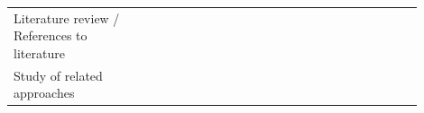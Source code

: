 \documentclass[english, 12pt, a4paper, sci, utf8, a-1b, online]{aaltothesis}
\begin{document}
{\begin{center}
\begin{longtable}{p{0.3\linewidth}p{0.6\linewidth}}
      Literature review / References to literature & \textcite{fagerholm-dx-concept-and-definition} \newline \textcite{henriques2018improving} \newline \textcite{fontao2017investigating} \newline \textcite{chatley2019supporting} \newline \textcite{pinter2019polymorph} \newline \textcite{entering-an-ecosystem} \newline \textcite{fagerholm2014examining} \newline \textcite{fontao2016mseco} \newline \textcite{fontao2015research} \newline \textcite{myers2016improving} \newline \textcite{ekwoge2017tester} \newline \textcite{romano2018effect} \newline \textcite{open-service-innovation} \newline \textcite{de2017towards} \newline \textcite{programmer-experience} \newline \textcite{oran2017set}                                                                                                                                                                                                                                                                                   \\
      Study of related approaches                  & \textcite{fagerholm-dx-concept-and-definition} \newline \textcite{henriques2018improving}                                                                                                                                                                                                                                                                                                                                                                                                                                                                                                                                                                                                                                                                                                                                                                                                                                                          \\

\end{longtable}
\end{center}}
\end{document}

